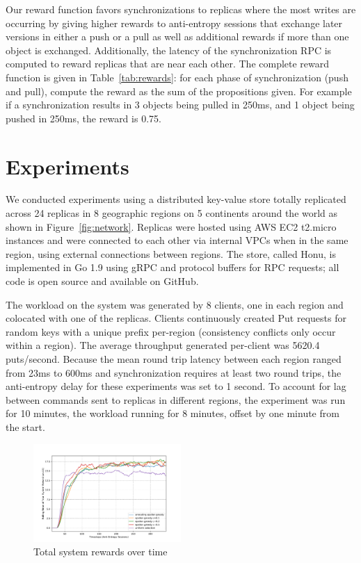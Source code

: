 Our reward function favors synchronizations to replicas where the most writes
are occurring by giving higher rewards to anti-entropy sessions that exchange
later versions in either a push or a pull as well as additional rewards if
more than one object is exchanged.
Additionally, the latency of the synchronization RPC is computed to reward
replicas that are near each other.
The complete reward function is given in Table~\ref{tab:rewards}: for each
phase of synchronization (push and pull), compute the reward as the sum of the
propositions given.
For example if a synchronization results in 3 objects being pulled in 250ms,
and 1 object being pushed in 250ms, the reward is 0.75.

\section*{Experiments}

We conducted experiments using a distributed key-value store totally
replicated across 24 replicas in 8 geographic regions on 5 continents
around the world as shown in Figure~\ref{fig:network}.
Replicas were hosted using AWS EC2 t2.micro instances and were connected to
each other via internal VPCs when in the same region, using external
connections between regions.
The store, called Honu, is implemented in Go 1.9 using gRPC and protocol
buffers for RPC requests; all code is open source and available on GitHub.

The workload on the system was generated by 8 clients, one in each region and
colocated with one of the replicas.
Clients continuously created Put requests for random keys with a unique
prefix per-region (consistency conflicts only occur within a region).
The average throughput generated per-client was 5620.4 puts/second.
Because the mean round trip latency between each region ranged from 23ms to
600ms and synchronization requires at least two round trips, the
anti-entropy delay for these experiments was set to 1 second.
To account for lag between commands sent to replicas in different regions,
the experiment was run for 10 minutes, the workload running for 8 minutes,
offset by one minute from the start.

\begin{figure}[t]
    \centering
    \includegraphics[width=0.5\textwidth]{figures/rewards}
    \caption{Total system rewards over time}
    \label{fig:system_rewards}
\end{figure}

